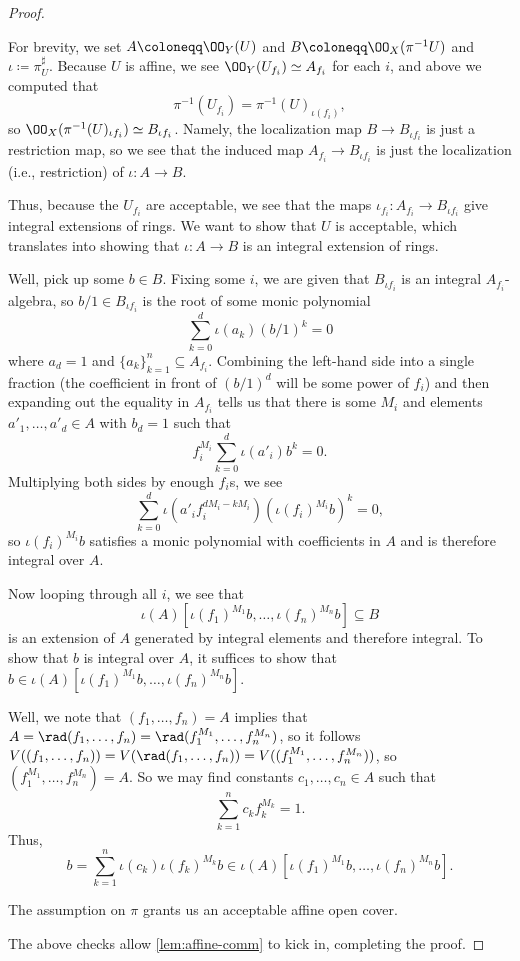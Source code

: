 \documentclass[../notes.tex]{subfiles}
\begin{document}
\begin{proof}
\begin{listroman}
		For brevity, we set $A\coloneqq\OO_Y(U)$ and $B\coloneqq\OO_X(\pi^{-1}U)$ and $\iota\coloneqq\pi^\sharp_U$. Because $U$ is affine, we see $\OO_Y(U_{f_i})\simeq A_{f_i}$ for each $i$, and above we computed that
		\[\pi^{-1}(U_{f_i})=\pi^{-1}(U)_{\iota(f_i)},\]
		so $\OO_X(\pi^{-1}(U)_{\iota f_i})\simeq B_{\iota f_i}$. Namely, the localization map $B\to B_{\iota f_i}$ is just a restriction map, so we see that the induced map $A_{f_i}\to B_{\iota f_i}$ is just the localization (i.e., restriction) of $\iota\colon A\to B$.

		Thus, because the $U_{f_i}$ are acceptable, we see that the maps $\iota_{f_i}\colon A_{f_i}\to B_{\iota f_i}$ give integral extensions of rings. We want to show that $U$ is acceptable, which translates into showing that $\iota\colon A\to B$ is an integral extension of rings.

		Well, pick up some $b\in B$. Fixing some $i$, we are given that $B_{\iota f_i}$ is an integral $A_{f_i}$-algebra, so $b/1\in B_{\iota f_i}$ is the root of some monic polynomial
		\[\sum_{k=0}^d\iota(a_k)(b/1)^k=0\]
		where $a_d=1$ and $\{a_k\}_{k=1}^n\subseteq A_{f_i}$. Combining the left-hand side into a single fraction (the coefficient in front of $(b/1)^d$ will be some power of $f_i$) and then expanding out the equality in $A_{f_i}$ tells us that there is some $M_i$ and elements $a'_1,\ldots,a'_d\in A$ with $b_d=1$ such that
		\[f_i^{M_i}\sum_{k=0}^d\iota(a'_i)b^k=0.\]
		Multiplying both sides by enough $f_i$s, we see
		\[\sum_{k=0}^d\iota\left(a'_if_i^{dM_i-kM_i}\right)\left(\iota(f_i)^{M_i}b\right)^k=0,\]
		so $\iota(f_i)^{M_i}b$ satisfies a monic polynomial with coefficients in $A$ and is therefore integral over $A$.

		Now looping through all $i$, we see that
		\[\iota(A)\left[\iota(f_1)^{M_1}b,\ldots,\iota(f_n)^{M_n}b\right]\subseteq B\]
		is an extension of $A$ generated by integral elements and therefore integral. To show that $b$ is integral over $A$, it suffices to show that $b\in\iota(A)\left[\iota(f_1)^{M_1}b,\ldots,\iota(f_n)^{M_n}b\right]$.

		Well, we note that $(f_1,\ldots,f_n)=A$ implies that $A=\rad(f_1,\ldots,f_n)=\rad(f_1^{M_1},\ldots,f_n^{M_n})$, so it follows $V((f_1,\ldots,f_n))=V(\rad(f_1,\ldots,f_n))=V((f_1^{M_1},\ldots,f_n^{M_n}))$, so $(f_1^{M_1},\ldots,f_n^{M_n})=A$. So we may find constants $c_1,\ldots,c_n\in A$ such that
		\[\sum_{k=1}^nc_kf_k^{M_k}=1.\]
		Thus,
		\[b=\sum_{k=1}^n\iota(c_k)\iota(f_k)^{M_k}b\in\iota(A)\left[\iota(f_1)^{M_1}b,\ldots,\iota(f_n)^{M_n}b\right].\]
		\item The assumption on $\pi$ grants us an acceptable affine open cover.
	\end{listroman}
	The above checks allow \autoref{lem:affine-comm} to kick in, completing the proof.
\end{proof}
\end{document}
